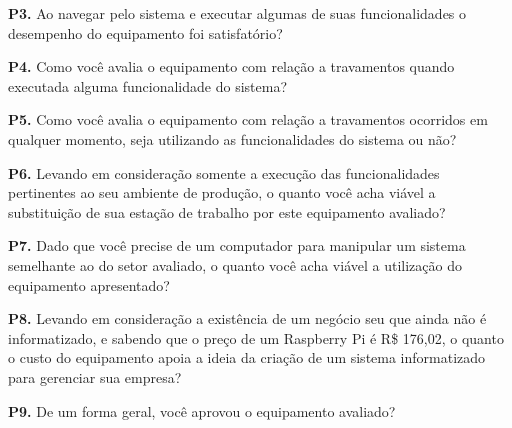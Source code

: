\textbf{P3.} Ao navegar pelo sistema e executar algumas de suas funcionalidades o desempenho do equipamento foi satisfatório?

\textbf{P4.} Como você avalia o equipamento com relação a travamentos quando executada alguma funcionalidade do sistema?

\textbf{P5.} Como você avalia o equipamento com relação a travamentos ocorridos em qualquer momento, seja utilizando as funcionalidades do sistema ou não?

\textbf{P6.} Levando em consideração somente a execução das funcionalidades pertinentes ao seu ambiente de produção, o quanto você acha viável a substituição de sua estação de trabalho por este equipamento avaliado?

\textbf{P7.} Dado que você precise de um computador para manipular um sistema semelhante ao do setor avaliado, o quanto você acha viável a utilização do equipamento apresentado?

\textbf{P8.} Levando em consideração a existência de um negócio seu que ainda não é informatizado, e sabendo que o preço de um Raspberry Pi é  R\$ 176,02, o quanto o custo do equipamento apoia a ideia da criação de um sistema informatizado para gerenciar sua empresa?

\textbf{P9.} De um forma geral, você aprovou o equipamento avaliado?

